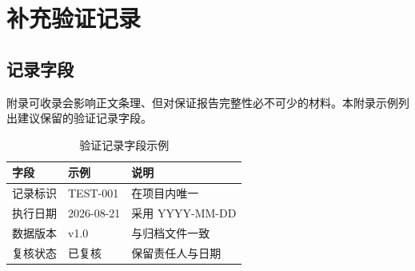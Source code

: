 \chapter{补充验证记录}

\section{记录字段}

附录可收录会影响正文条理、但对保证报告完整性必不可少的材料。本附录示例列出建议保留的验证记录字段。

\begin{table}[htbp]
  \centering
  \caption{验证记录字段示例}
  \label{tab:appendix-records}
  \ReportTableText
  \begin{tabular}{lll}
    \toprule
    字段 & 示例 & 说明 \\
    \midrule
    记录标识 & TEST-001 & 在项目内唯一 \\
    执行日期 & 2026-08-21 & 采用 YYYY-MM-DD \\
    数据版本 & v1.0 & 与归档文件一致 \\
    复核状态 & 已复核 & 保留责任人与日期 \\
    \bottomrule
  \end{tabular}
\end{table}
